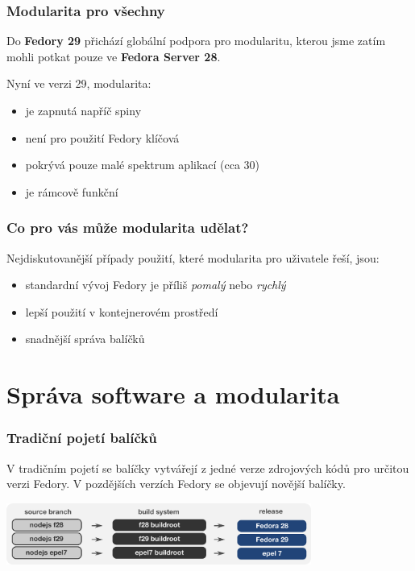 \documentclass[12pt]{beamer}
\begin{document}
\begin{frame}
\frametitle{Modularita pro všechny}
Do \textbf{Fedory 29} přichází globální podpora pro modularitu, kterou jsme zatím mohli potkat pouze ve \textbf{Fedora Server 28}. 

Nyní ve verzi 29, modularita:

\vspace{5pt}

\begin{itemize}
	\item je zapnutá napříč spiny
	\item není pro použití Fedory klíčová
	\item pokrývá pouze malé spektrum aplikací (cca 30)
	\item je rámcově funkční
\end{itemize}	
\end{frame}

\begin{frame}
\frametitle{Co pro vás může modularita udělat?}
Nejdiskutovanější případy použití, které modularita pro uživatele řeší, jsou:

\vspace{5pt}

\begin{itemize}
	\item standardní vývoj Fedory je příliš \textit{pomalý} nebo \textit{rychlý}
	\item lepší použití v kontejnerovém prostředí
	\item snadnější správa balíčků
\end{itemize}
\end{frame}

\section{Správa software a modularita}

\begin{frame}
\frametitle{Tradiční pojetí balíčků}
V tradičním pojetí se balíčky vytvářejí z jedné verze zdrojových kódů pro určitou verzi Fedory. V pozdějších verzích Fedory se objevují novější balíčky.
\begin{center}
	\includegraphics[width=10cm]{traditional}
\end{center}
\end{frame}
\end{document}
